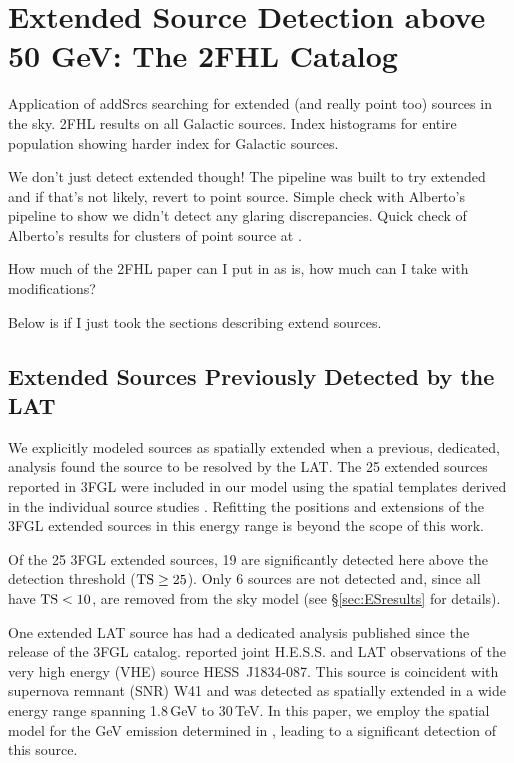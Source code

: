 \chapter{Extended Source Detection above 50 GeV: The 2FHL Catalog}
\label{chap:2FHL}

Application of addSrcs searching for extended (and really point too) sources in the sky. 2FHL results on all Galactic sources. Index histograms for entire \twofhl population showing harder index for Galactic sources.

We don't just detect extended though! The pipeline was built to try extended and if that's not likely, revert to point source. Simple check with Alberto's pipeline to show we didn't detect any glaring discrepancies. Quick check of Alberto's results for clusters of point source at \blat.

How much of the 2FHL paper can I put in as is, how much can I take with modifications?

Below is if I just took the sections describing extend sources. 

\section{\label{sec:3FGL_ES}Extended Sources Previously Detected by the LAT}
We explicitly modeled sources as spatially extended when a previous, dedicated, analysis found the source to be resolved by the LAT.
The 25 extended sources reported in 3FGL were included in our model using the spatial templates derived in the individual source studies \citep[see references in ][]{3FGL}. Refitting the positions and extensions of the 3FGL extended sources in this energy range is beyond the scope of this work.

Of the 25 3FGL extended sources, 19 are significantly detected here above the detection threshold (${\rm TS}\geq25$). Only 6 sources are not detected and, since all have  ${\rm TS<10}$, are removed from the sky model (see \S\ref{sec:ESresults} for details).

One extended LAT source has had a dedicated analysis published since the release of the 3FGL catalog. \cite{HESSLATW41} reported joint H.E.S.S. and LAT observations of the very high energy (VHE) source HESS~J1834-087. This source is coincident with supernova remnant (SNR) W41 and was detected  as spatially extended in a wide energy range spanning 1.8\,GeV to 30\,TeV. In this paper, we employ the spatial model for the GeV emission determined in \cite{HESSLATW41}, leading to a significant detection of this source.



